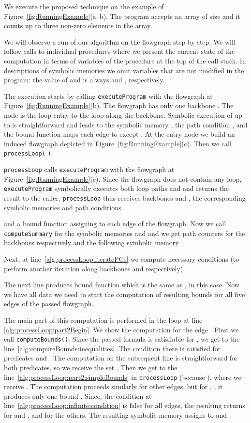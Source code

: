 \documentclass[10pt,a4paper]{article}
\begin{document}
We execute the proposed technique on the example of
Figure~\ref{fig:RunningExample}(a--b). The program accepts an array
 of size  and it counts up to three non-zero
elements in the array.

We will observe a run of our algorithm on the flowgraph step by step. We
will follow calls to individual procedures where we present the current
state of the computation in terms of variables of the procedure at the top
of the call stack. In descriptions of symbolic memories we omit variables
that are not modified in the program: the value of  and 
is always  and , respectively.

The execution starts by calling \texttt{executeProgram} with the flowgraph at
Figure~\ref{fig:RunningExample}(b). The flowgraph has only one backbone
. The node  is the loop entry to the loop
 along the backbone. Symbolic execution of  up to 
is straightforward and leads to the symbolic memory
, the
path condition , and the bound function  maps each
edge to  except . At the entry node
 we build an induced flowgraph  depicted in
Figure~\ref{fig:RunningExample}(c). Then we call \texttt{processLoop(} \texttt{)}.



\texttt{processLoop} calls \texttt{executeProgram} with the
flowgraph at Figure~\ref{fig:RunningExample}(c). Since the flowgraph does not
contain any loop, \texttt{executeProgram} symbolically executes both loop
paths  and  and returns the result to the
caller. \texttt{processLoop} thus receives backbones 
and , the corresponding symbolic memories and path
conditions

and a bound function  assigning  to each edge of
the flowgraph. Now we call \texttt{computeSummary} for the symbolic memories  and  and we get path counters
 for the backbones 
respectively and the following symbolic memory 

Next, at line~\ref{alg:processLoop:iteratePCs} we compute necessary conditions
(to perform another iteration along backbones  and  respectively)

The next line produces bound function  which is the same
as , in this case. Now we have all data we need to start
the computation of resulting bounds for all five edges of the passed flowgraph.

The main part of this computation is performed in the loop at line
\ref{alg:processLoop:part2Begin}. We show the computation for the edge
. First we call
\texttt{computeBounds(}\texttt{)}. Since the passed formula is
satisfiable for , we get to the
line~\ref{alg:computeBounds:inequalities}. The condition there is
satisfied for predicates  and
. The computation on the subsequent line is
straightforward for both predicates, so we receive the set
. Then we get to the
line~\ref{alg:processLoop:part2:simpleBounds} in \texttt{processLoop}
(because ), where we receive
. The
computation proceeds similarly for other edges, but for
, ,  it produces only one bound
. Since, the condition at
line~\ref{alg:processLoop:infinite:condition} is false for all edges,
the resulting  returns
  for  and , and
 for the others. The resulting symbolic
memory  assigns  to  and
.
\end{document}
